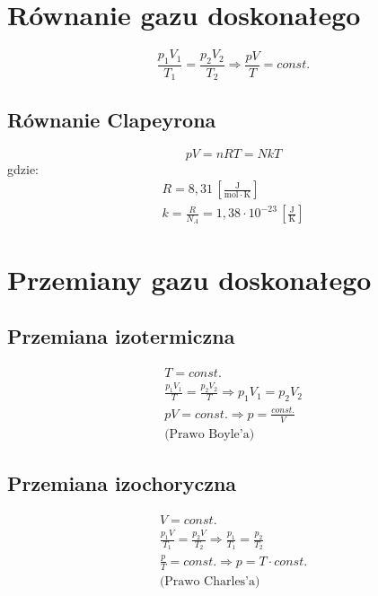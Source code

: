 \documentclass{report}
\numberwithin{equation}{chapter}
\newcommand{\unit}[1]{\,\left[\mathrm{#1}\right]}
\begin{document}
    \section{Równanie gazu doskonałego}
      \begin{equation}
        \frac{p_1V_1}{T_1} = \frac{p_2V_2}{T_2} \Rightarrow \frac{pV}{T} = const.
      \end{equation}
      \subsection{Równanie Clapeyrona}
        \begin{equation}
          pV = nRT = NkT
        \end{equation}
        gdzie:
        \begin{gather}
          R =  8,31 \unit{\frac{J}{mol\cdot K}}\\
          k = \frac{R}{N_A} = 1,38\cdot 10^{-23} \unit{\frac{J}{K}}
        \end{gather}
    \section{Przemiany gazu doskonałego}
      \subsection{Przemiana izotermiczna}
        \begin{gather}
          T = const.\\
          \frac{p_1V_1}{T} = \frac{p_2V_2}{T} \Rightarrow p_1V_1 = p_2V_2\\
          pV = const. \Rightarrow p = \frac{const.}{V}\\
          \text{(Prawo Boyle'a)}
        \end{gather}
      \subsection{Przemiana izochoryczna}
        \begin{gather}
          V = const.\\
          \frac{p_1V}{T_1} = \frac{p_2V}{T_2} \Rightarrow \frac{p_1}{T_1} = \frac{p_2}{T_2}\\
          \frac{p}{T} = const. \Rightarrow p = T\cdot const.\\\text{(Prawo Charles'a)}
        \end{gather}
\end{document}
